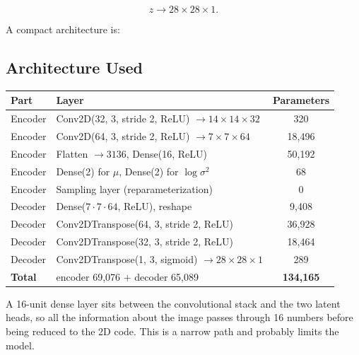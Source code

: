\documentclass[10pt]{article}
\begin{document}
\[
z\rightarrow28\times28\times1.
\]

A compact architecture is:

\begin{center}
\end{center}

\subsection*{Architecture Used}

\begin{center}
\begin{tabular}{|l|l|c|}
\hline
Part & Layer & Parameters\\
\hline
Encoder & Conv2D(32, 3, stride 2, ReLU) $\rightarrow14\times14\times32$ & 320\\
Encoder & Conv2D(64, 3, stride 2, ReLU) $\rightarrow7\times7\times64$ & 18,496\\
Encoder & Flatten $\rightarrow3136$, Dense(16, ReLU) & 50,192\\
Encoder & Dense(2) for $\mu$, Dense(2) for $\log\sigma^2$ & 68\\
Encoder & Sampling layer (reparameterization) & 0\\
\hline
Decoder & Dense($7\cdot7\cdot64$, ReLU), reshape & 9,408\\
Decoder & Conv2DTranspose(64, 3, stride 2, ReLU) & 36,928\\
Decoder & Conv2DTranspose(32, 3, stride 2, ReLU) & 18,464\\
Decoder & Conv2DTranspose(1, 3, sigmoid) $\rightarrow28\times28\times1$ & 289\\
\hline
\textbf{Total} & encoder 69,076 $+$ decoder 65,089 & \textbf{134,165}\\
\hline
\end{tabular}
\end{center}

A 16-unit dense layer sits between the convolutional stack and the two latent
heads, so all the information about the image passes through 16 numbers before
being reduced to the 2D code. This is a narrow path and probably limits the model.
\end{document}
